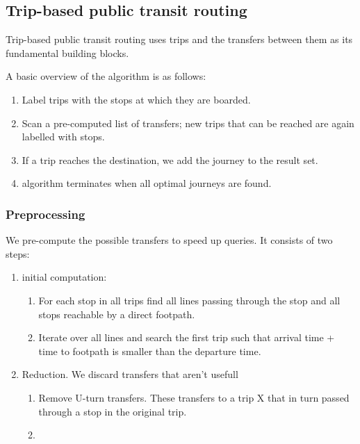 \subsection{}
\subsection{Trip-based public transit routing}
Trip-based public transit routing uses trips and the transfers between them as its fundamental building blocks. 

A basic overview of the algorithm is as follows:
\begin{enumerate}
    \item Label trips with the stops at which they are boarded.
    \item Scan a pre-computed list of transfers; new trips that can be reached are again labelled with stops.
    \item If a trip reaches the destination, we add the journey to the result set.
    \item algorithm terminates when all optimal journeys are found.
\end{enumerate}
\subsubsection{Preprocessing}
We pre-compute the possible transfers to speed up queries. It consists of two steps:
\begin{enumerate}
    \item initial computation: \begin{enumerate}
        \item For each stop in all trips  find all lines passing through the stop and all stops reachable by a direct footpath.
        \item Iterate over all lines and search the first trip such that arrival  time + time to footpath is smaller than the departure time.
    \end{enumerate}
    \item Reduction. We discard transfers that aren't usefull \begin{enumerate}
        \item Remove U-turn transfers. These transfers to a trip X that in turn passed through a stop in the original trip.
        \item 
    \end{enumerate}
    
\end{enumerate}
